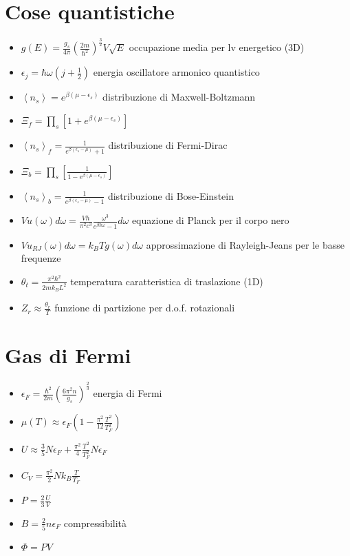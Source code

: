 \documentclass[a4paper]{article}
\begin{document}
    \section{Cose quantistiche}
        \begin{itemize}
            \item $g(E)=\frac{g_s}{4\pi}\left(\frac{2m}{\hbar^2}\right)^{\frac{3}{2}}V\sqrt{E}$ occupazione media per lv energetico (3D)
            \item $\epsilon_j=\hbar\omega\left(j+\frac{1}{2}\right)$ energia oscillatore armonico quantistico
            \item $\left\langle n_s \right\rangle=e^{\beta(\mu-\epsilon_s)}$ distribuzione di Maxwell-Boltzmann
            \item $\Xi_f=\prod_s\left[1+e^{\beta(\mu-\epsilon_s)}\right]$
            \item $\left\langle n_s \right\rangle_f=\frac{1}{e^{\beta(\epsilon_s-\mu)}+1}$ distribuzione di Fermi-Dirac
            \item $\Xi_b=\prod_s\left[\frac{1}{1-e^{\beta(\mu-\epsilon_s)}}\right]$
            \item $\left\langle n_s \right\rangle_b=\frac{1}{e^{\beta(\epsilon_s-\mu)}-1}$ distribuzione di Bose-Einstein
            \item $Vu(\omega)d\omega=\frac{V\hbar}{\pi^2c^3}\frac{\omega^3}{e^{\beta\hbar\omega}-1}d\omega$ equazione di Planck per il corpo nero
            \item $Vu_{RJ}(\omega)d\omega=k_BTg(\omega)d\omega$ approssimazione di Rayleigh-Jeans per le basse frequenze
            \item $\theta_t=\frac{\pi^2\hbar^2}{2mk_BL^2}$ temperatura caratteristica di traslazione (1D)
            \item $Z_r\approx \frac{\theta_r}{T}$ funzione di partizione per d.o.f. rotazionali
        \end{itemize}

    \section{Gas di Fermi}
        \begin{itemize}
            \item $\epsilon_F=\frac{\hbar^2}{2m}\left(\frac{6\pi^2n}{g_s}\right)^{\frac{2}{3}}$ energia di Fermi
            \item $\mu(T)\approx\epsilon_F\left(1-\frac{\pi^2}{12}\frac{T^2}{T_F^2}\right)$
            \item $U\approx\frac{3}{5}N\epsilon_F+\frac{\pi^2}{4}\frac{T^2}{T_F^2}N\epsilon_F$
            \item $C_V=\frac{\pi^2}{2}Nk_B\frac{T}{T_F}$
            \item $P=\frac{2}{3}\frac{U}{V}$
            \item $B=\frac{2}{5}n\epsilon_F$ compressibilità
            \item $\Phi=PV$
        \end{itemize}
\end{document}
